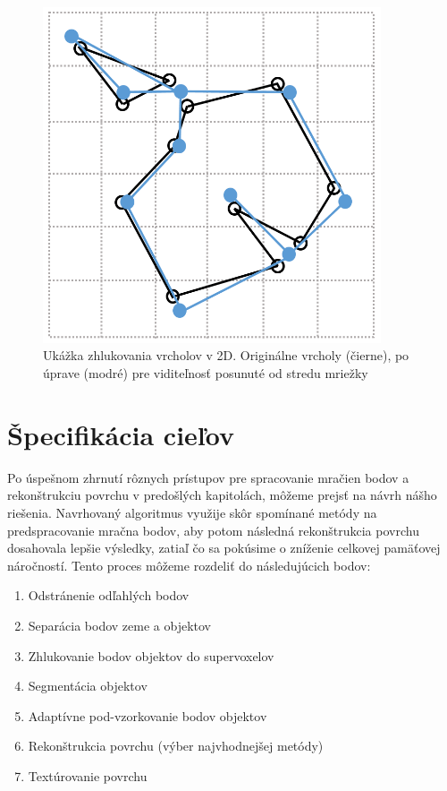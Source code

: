\newpage\vfill
\begin{figure}[ht]
  \centering
  \includegraphics[width=10cm]{img/vertex_clustering.png}
  \caption{Ukážka zhlukovania vrcholov v 2D. Originálne vrcholy (čierne), po úprave (modré) pre viditeľnosť posunuté od stredu mriežky} 
  \label{fig:verte_cluster}
\end{figure} 
\vfill\clearpage

\section{Špecifikácia cieľov}
\noindent Po úspešnom zhrnutí rôznych prístupov pre spracovanie mračien bodov a rekonštrukciu  povrchu v predošlých kapitolách, môžeme prejsť na návrh nášho riešenia. Navrhovaný algoritmus využije skôr spomínané metódy na predspracovanie mračna bodov, aby potom následná rekonštrukcia povrchu dosahovala lepšie výsledky, zatiaľ čo sa pokúsime o zníženie celkovej pamäťovej náročností. Tento proces môžeme rozdeliť do následujúcich bodov:
\begin{enumerate}
    \item Odstránenie odľahlých bodov
    \item Separácia bodov zeme a objektov
    \item Zhlukovanie bodov objektov do supervoxelov
    \item Segmentácia objektov
    \item Adaptívne pod-vzorkovanie bodov objektov
    \item Rekonštrukcia povrchu (výber najvhodnejšej metódy)
    \item Textúrovanie povrchu
\end{enumerate}

